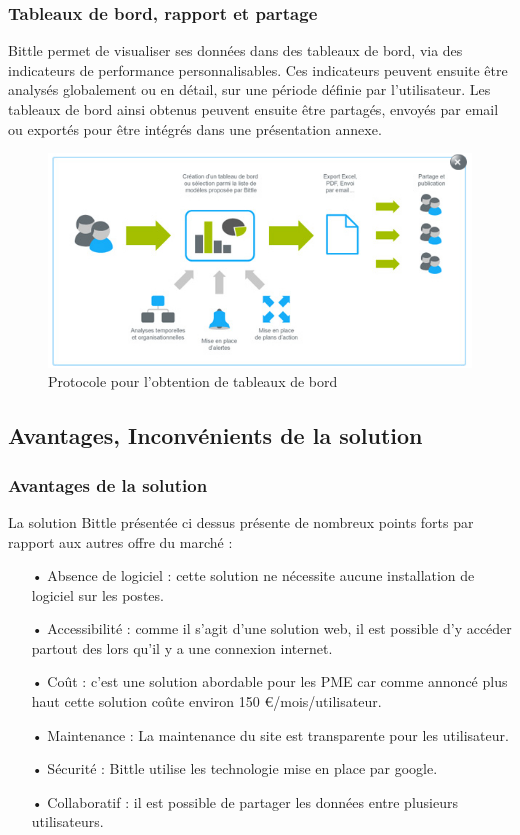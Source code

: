 \subsubsection{Tableaux de bord, rapport et partage}
Bittle permet de visualiser ses données dans des tableaux de bord, via des indicateurs de performance personnalisables. Ces indicateurs peuvent ensuite être analysés globalement ou en détail, sur une période définie par l’utilisateur. Les tableaux de bord ainsi obtenus peuvent ensuite être partagés, envoyés par email ou exportés pour être intégrés dans une présentation annexe.

\begin{figure}[H]
\begin{center}
  \includegraphics[scale= 0.6]{tableau.png}
  \caption{Protocole pour l'obtention de tableaux de bord}
\end{center}  
\end{figure}

\subsection{Avantages, Inconvénients de la solution}
\subsubsection{Avantages de la solution}
La solution Bittle présentée ci dessus présente de nombreux points forts par rapport aux autres offre du marché :
 
\begin{itemize}
\item[•]Absence de logiciel : cette solution ne nécessite aucune installation de logiciel sur les postes.
\item[•]Accessibilité : comme il s'agit d'une solution web, il est possible d'y accéder partout des lors qu'il y a une connexion internet.
\item[•]Coût : c'est une solution abordable pour les PME car comme annoncé plus haut cette solution coûte environ 150 €/mois/utilisateur.
\item[•]Maintenance : La maintenance du site est transparente pour les utilisateur.
\item[•]Sécurité : Bittle utilise les technologie mise en place par google.
\item[•]Collaboratif : il est possible de partager les données entre plusieurs utilisateurs.
\end{itemize}

